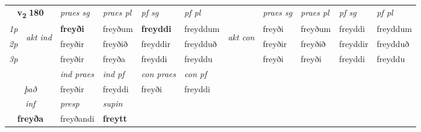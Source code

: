 \noindent
\begin{tabular}{lllllllllll} \toprule
\multicolumn{2}{c}{\textbf{v{\textsubscript{2}}} \Large{\textbf{180}}}  &  \textit{praes sg}  & \textit{praes pl}  &\textit{ pf sg} & \textit{pf pl} &  &  \textit{praes sg}  & \textit{praes pl}  & \textit{pf sg} & \textit{pf pl } \\*
	\cmidrule{3-6} \cmidrule{8-11}
 {\textit{1p}} & \multirow{3}{*}{\begin{turn}{90}\textit{akt ind}\end{turn}} & \textbf{freyði} & freyðum & \textbf{freyddi} & freyddum & \multirow{3}{*}{\begin{turn}{90}\textit{akt con}\end{turn}} &freyði & freyðum & freyddi & freyddum\\*
 {\textit{2p}} &  &  freyðir  & freyðið & freyddir & freydduð & & freyðir & freyðið & freyddir & freydduð \\*
{\textit{3p}} &  & freyðir & freyða & freyddi & freyddu & & freyði & freyði& freyddi & freyddu \\*
\cmidrule{3-6} \cmidrule{8-11}

   & &  \textit{ind praes} & \textit{ind pf} & \textit{con praes} & \textit{con pf} \\*
\multicolumn{2}{c}{ \textit{það} } & freyðir & freyddi & freyði & freyddi \\*

\cmidrule{3-4}
   \multicolumn{2}{c}{\textit{inf}}     & \textit{presp} & \textit{supin}   \\*
  \multicolumn{2}{c}{\textbf{freyða}}      & freyðandi &  \textbf{freytt}   \\*
\end{tabular}

